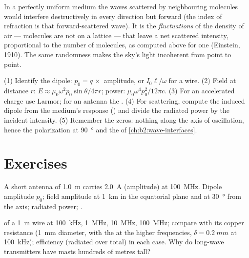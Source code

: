 \begin{remark}\label{rem:b2:dipole-radiation:why}
In a perfectly uniform medium the waves scattered by neighbouring
molecules would interfere destructively in every direction but forward
(the index of refraction is that forward-scattered wave). It is the
\emph{fluctuations} of the density of air --- molecules are not on a
lattice --- that leave a net scattered intensity, proportional to the
number of molecules, as computed above for one (Einstein, 1910). The
same randomness makes the sky's light incoherent from point to point.
\end{remark}

\begin{method}\label{met:b2:dipole-radiation:method}
(1) Identify the dipole: $p_0 = q\,\times$ amplitude, or $I_0\ell/\omega$ for a
wire. (2) Field at distance $r$: $E \approx \mu_0\omega^2p_0\sin\theta/4\pi r$; power:
$\mu_0\omega^4p_0^2/12\pi c$. (3) For an accelerated charge use Larmor; for
an antenna the . (4) For scattering, compute the
induced dipole from the medium's response () and divide
the radiated power by the incident intensity. (5) Remember the zeros:
nothing along the axis of oscillation, hence the polarization at
\qty{90}{\degree} and the  of \cref{ch:b2:wave-interfaces}.
\end{method}

\section{Exercises}

\begin{exercise}[$\star$]\label{exo:b2:dipole-radiation:1}
A short antenna of \qty{1.0}{m} carries \qty{2.0}{A} (amplitude) at
\qty{100}{MHz}. Dipole amplitude $p_0$; field amplitude at \qty{1}{km} in the
equatorial plane and at \qty{30}{\degree} from the axis; radiated power;
.
\end{exercise}

\begin{exercise}[$\star$]\label{exo:b2:dipole-radiation:2}
 of a \qty{1}{m} wire at \qty{100}{kHz}, \qty{1}{MHz},
\qty{10}{MHz}, \qty{100}{MHz}; compare with its copper resistance
(\qty{1}{mm} diameter, with the  at the higher frequencies,
$\delta = \qty{0.2}{mm}$ at \qty{100}{kHz}); efficiency (radiated over total)
in each case. Why do long-wave transmitters have masts hundreds of
metres tall?
\end{exercise}

